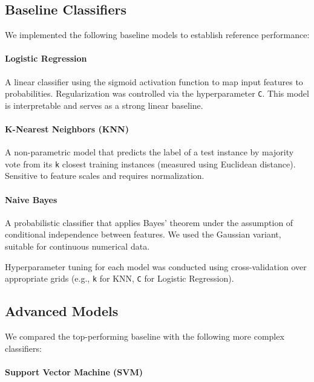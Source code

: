 \documentclass{article}
\begin{document}
\subsection{Baseline Classifiers}

We implemented the following baseline models to establish reference performance:



\paragraph{Logistic Regression} A linear classifier using the sigmoid activation function to map input features to probabilities. Regularization was controlled via the hyperparameter \texttt{C}. This model is interpretable and serves as a strong linear baseline.



\paragraph{K-Nearest Neighbors (KNN)} A non-parametric model that predicts the label of a test instance by majority vote from its \texttt{k} closest training instances (measured using Euclidean distance). Sensitive to feature scales and requires normalization.



\paragraph{Naive Bayes} A probabilistic classifier that applies Bayes’ theorem under the assumption of conditional independence between features. We used the Gaussian variant, suitable for continuous numerical data.



Hyperparameter tuning for each model was conducted using cross-validation over appropriate grids (e.g., \texttt{k} for KNN, \texttt{C} for Logistic Regression).



\subsection{Advanced Models}

We compared the top-performing baseline with the following more complex classifiers:



\paragraph{Support Vector Machine (SVM)}
\end{document}
